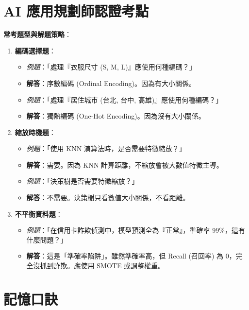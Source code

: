\documentclass[
  letterpaper,
  DIV=11,
  numbers=noendperiod]{scrreprt}
\providecommand{\tightlist}{%
  \setlength{\itemsep}{0pt}\setlength{\parskip}{0pt}}
\begin{document}
\section{AI
應用規劃師認證考點}\label{ai-ux61c9ux7528ux898fux5283ux5e2bux8a8dux8b49ux8003ux9ede-3}

\textbf{常考題型與解題策略}：

\begin{enumerate}
\def\labelenumi{\arabic{enumi}.}
\tightlist
\item
  \textbf{編碼選擇題}：

  \begin{itemize}
  \tightlist
  \item
    \emph{例題}：「處理『衣服尺寸 (S, M, L)』應使用何種編碼？」
  \item
    \textbf{解答}：序數編碼 (Ordinal Encoding)。因為有大小關係。
  \item
    \emph{例題}：「處理『居住城市 (台北, 台中, 高雄)』應使用何種編碼？」
  \item
    \textbf{解答}：獨熱編碼 (One-Hot Encoding)。因為沒有大小關係。
  \end{itemize}
\item
  \textbf{縮放時機題}：

  \begin{itemize}
  \tightlist
  \item
    \emph{例題}：「使用 KNN 演算法時，是否需要特徵縮放？」
  \item
    \textbf{解答}：需要。因為 KNN 計算距離，不縮放會被大數值特徵主導。
  \item
    \emph{例題}：「決策樹是否需要特徵縮放？」
  \item
    \textbf{解答}：不需要。決策樹只看數值大小關係，不看距離。
  \end{itemize}
\item
  \textbf{不平衡資料題}：

  \begin{itemize}
  \tightlist
  \item
    \emph{例題}：「在信用卡詐欺偵測中，模型預測全為『正常』，準確率
    99\%，這有什麼問題？」
  \item
    \textbf{解答}：這是「準確率陷阱」。雖然準確率高，但 Recall (召回率)
    為 0，完全沒抓到詐欺。應使用 SMOTE 或調整權重。
  \end{itemize}
\end{enumerate}

\section{記憶口訣}\label{ux8a18ux61b6ux53e3ux8a23-3}
\end{document}
